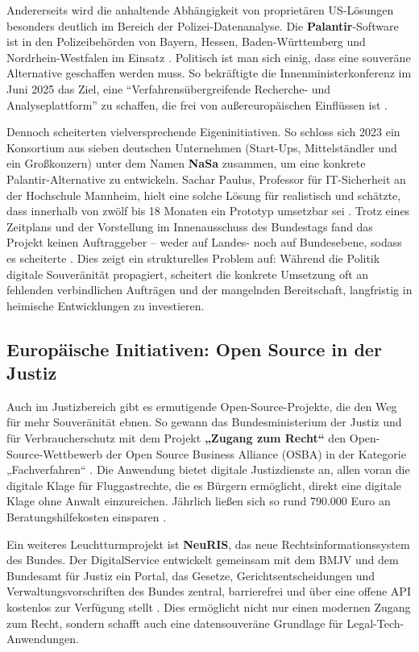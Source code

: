 \documentclass[12pt,a4paper]{article}
\begin{document}
	Andererseits wird die anhaltende Abhängigkeit von proprietären US-Lösungen besonders deutlich im Bereich der Polizei-Datenanalyse. Die \textbf{Palantir}-Software ist in den Polizeibehörden von Bayern, Hessen, Baden-Württemberg und Nordrhein-Westfalen im Einsatz \cite{Tagesschau2025}. Politisch ist man sich einig, dass eine souveräne Alternative geschaffen werden muss. So bekräftigte die Innenministerkonferenz im Juni 2025 das Ziel, eine \enquote{Verfahrensübergreifende Recherche- und Analyseplattform} zu schaffen, die frei von außereuropäischen Einflüssen ist \cite{Tagesschau2025}.
	
	Dennoch scheiterten vielversprechende Eigeninitiativen. So schloss sich 2023 ein Konsortium aus sieben deutschen Unternehmen (Start-Ups, Mittelständler und ein Großkonzern) unter dem Namen \textbf{NaSa} zusammen, um eine konkrete Palantir-Alternative zu entwickeln. Sachar Paulus, Professor für IT-Sicherheit an der Hochschule Mannheim, hielt eine solche Lösung für realistisch und schätzte, dass innerhalb von zwölf bis 18 Monaten ein Prototyp umsetzbar sei \cite{Tagesschau2025}. Trotz eines Zeitplans und der Vorstellung im Innenausschuss des Bundestags fand das Projekt keinen Auftraggeber – weder auf Landes- noch auf Bundesebene, sodass es scheiterte \cite{Tagesschau2025}. Dies zeigt ein strukturelles Problem auf: Während die Politik digitale Souveränität propagiert, scheitert die konkrete Umsetzung oft an fehlenden verbindlichen Aufträgen und der mangelnden Bereitschaft, langfristig in heimische Entwicklungen zu investieren.
	
	\subsection{Europäische Initiativen: Open Source in der Justiz}
	
	Auch im Justizbereich gibt es ermutigende Open-Source-Projekte, die den Weg für mehr Souveränität ebnen. So gewann das Bundesministerium der Justiz und für Verbraucherschutz mit dem Projekt \textbf{„Zugang zum Recht“} den Open-Source-Wettbewerb der Open Source Business Alliance (OSBA) in der Kategorie „Fachverfahren“ \cite{Heise2025c}. Die Anwendung bietet digitale Justizdienste an, allen voran die digitale Klage für Fluggastrechte, die es Bürgern ermöglicht, direkt eine digitale Klage ohne Anwalt einzureichen. Jährlich ließen sich so rund 790.000 Euro an Beratungshilfekosten einsparen \cite{Heise2025c}.
	
	Ein weiteres Leuchtturmprojekt ist \textbf{NeuRIS}, das neue Rechtsinformationssystem des Bundes. Der DigitalService entwickelt gemeinsam mit dem BMJV und dem Bundesamt für Justiz ein Portal, das Gesetze, Gerichtsentscheidungen und Verwaltungsvorschriften des Bundes zentral, barrierefrei und über eine offene API kostenlos zur Verfügung stellt \cite{NeuRIS2025}. Dies ermöglicht nicht nur einen modernen Zugang zum Recht, sondern schafft auch eine datensouveräne Grundlage für Legal-Tech-Anwendungen.
	
\end{document}
